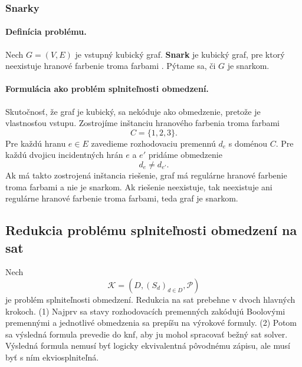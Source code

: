 \subsubsection{Snarky}\label{sec:combinatorics:snarks}
\paragraph{Definícia problému.}
Nech $G=(V,E)$ je vstupný kubický graf. \textbf{Snark} je kubický graf, pre ktorý neexistuje hranové farbenie troma farbami \cite{fiol2018measures}. Pýtame sa, či $G$ je snarkom.

\paragraph{Formulácia ako problém splniteľnosti obmedzení.}
Skutočnosť, že graf je kubický, sa nekóduje ako obmedzenie, pretože je vlastnosťou vstupu. Zostrojíme inštanciu hranového farbenia troma farbami
\[
    C=\{1,2,3\}.
\]
Pre každú hranu $e \in E$ zavedieme rozhodovaciu premennú $d_e$ s doménou $C$. Pre každú dvojicu incidentných hrán $e$ a $e'$ pridáme obmedzenie
\[
    d_e \neq d_{e'}.
\]
Ak má takto zostrojená inštancia riešenie, graf má regulárne hranové farbenie troma farbami a nie je snarkom. Ak riešenie neexistuje, tak neexistuje ani regulárne hranové farbenie troma farbami, teda graf je snarkom.

\subsection{Redukcia problému splniteľnosti obmedzení na \acrshort{sat}}\label{sec:combinatorics:reduction}
Nech
\[
    \mathcal{K} = (D,(S_d)_{d \in D},\mathcal{P})
\]
je problém splniteľnosti obmedzení. Redukcia na \acrshort{sat} prebehne v dvoch hlavných krokoch. (1) Najprv sa stavy rozhodovacích premenných zakódujú Boolovými premennými a jednotlivé obmedzenia sa prepíšu na výrokové formuly. (2) Potom sa výsledná formula prevedie do \acrshort{knf}, aby ju mohol spracovať bežný \acrshort{sat} solver. Výsledná formula nemusí byť logicky ekvivalentná pôvodnému zápisu, ale musí byť s ním ekviosplniteľná.

